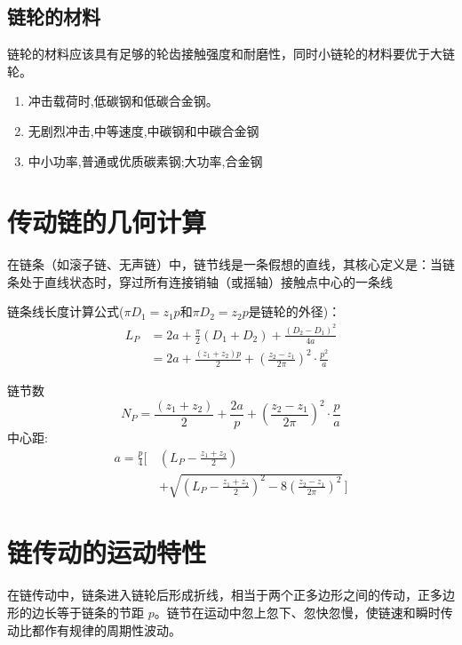 \subsection{链轮的材料}
链轮的材料应该具有足够的轮齿接触强度和耐磨性，同时小链轮的材料要优于大链轮。
\begin{enumerate}
    \item 冲击载荷时,低碳钢和低碳合金钢。
    \item 无剧烈冲击,中等速度,中碳钢和中碳合金钢
    \item 中小功率,普通或优质碳素钢;大功率,合金钢
\end{enumerate}
\section{传动链的几何计算}
\begin{definition}[链节线]
    在链条（如滚子链、无声链）中，链节线是一条假想的直线，其核心定义是：当链条处于直线状态时，穿过所有连接销轴（或摇轴）接触点中心的一条线
\end{definition}
链条线长度计算公式($\pi D_1=z_1p$和$\pi D_2=z_2p$是链轮的外径)：
\begin{equation}
	\begin{aligned}
		L_P&=2 a+\frac{\pi}{2}\left(D_{1}+D_{2}\right)+\frac{\left(D_{2}-D_{1}\right)^{2}}{4 a}\\
		&=2 a+\frac{\left(z_{1}+z_{2}\right) p}{2}+\left(\frac{z_{2}-z_{1}}{2 \pi}\right)^{2} \cdot \frac{p^{2}}{a}
	\end{aligned}
\end{equation}

链节数
\begin{equation}
	N_P=\frac{\left(z_{1}+z_{2}\right)}{2}+\frac{2 a}{p}+\left(\frac{z_{2}-z_{1}}{2 \pi}\right)^{2} \cdot \frac{p}{a}
\end{equation}
中心距:
\begin{equation}
	\begin{aligned}
		a=\frac{p}{4}\Bigg[\,&\left(L_{P}-\frac{z_{1}+z_{2}}{2}\right)\\
		&+\sqrt{\left(L_{P}-\frac{z_{1}+z_{2}}{2}\right)^{2}-8\left(\frac{z_{2}-z_{1}}{2 \pi}\right)^{2}}\,\Bigg]
	\end{aligned}
\end{equation}
\section{链传动的运动特性}
在链传动中，链条进入链轮后形成折线，相当于两个正多边形之间的传动，正多边形的边长等于链条的节距 $p$。链节在运动中忽上忽下、忽快忽慢，使链速和瞬时传动比都作有规律的周期性波动。

